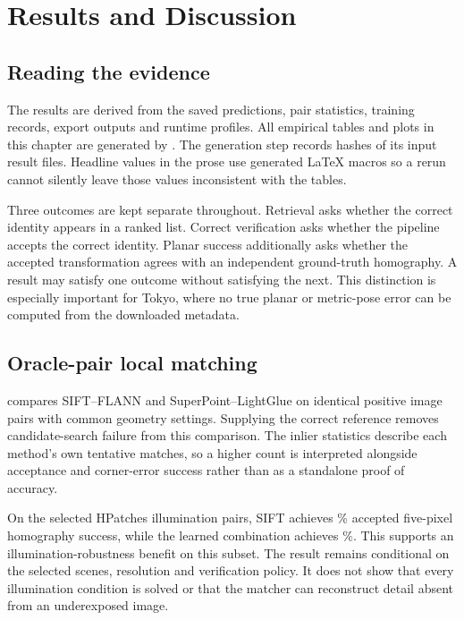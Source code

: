 \chapter{Results and Discussion}\label{ch:results}
\section{Reading the evidence}
The results are derived from the saved predictions, pair statistics, training records, export outputs and runtime profiles. All empirical tables and plots in this chapter are generated by . The generation step records hashes of its input result files. Headline values in the prose use generated LaTeX macros so a rerun cannot silently leave those values inconsistent with the tables.

Three outcomes are kept separate throughout. Retrieval asks whether the correct identity appears in a ranked list. Correct verification asks whether the pipeline accepts the correct identity. Planar success additionally asks whether the accepted transformation agrees with an independent ground-truth homography. A result may satisfy one outcome without satisfying the next. This distinction is especially important for Tokyo, where no true planar or metric-pose error can be computed from the downloaded metadata.

\section{Oracle-pair local matching}
 compares SIFT--FLANN and SuperPoint--LightGlue on identical positive image pairs with common geometry settings. Supplying the correct reference removes candidate-search failure from this comparison. The inlier statistics describe each method's own tentative matches, so a higher count is interpreted alongside acceptance and corner-error success rather than as a standalone proof of accuracy.

On the selected HPatches illumination pairs, SIFT achieves \HpIllumSift\% accepted five-pixel homography success, while the learned combination achieves \HpIllumLearned\%. This supports an illumination-robustness benefit on this subset. The result remains conditional on the selected scenes, resolution and verification policy. It does not show that every illumination condition is solved or that the matcher can reconstruct detail absent from an underexposed image.


